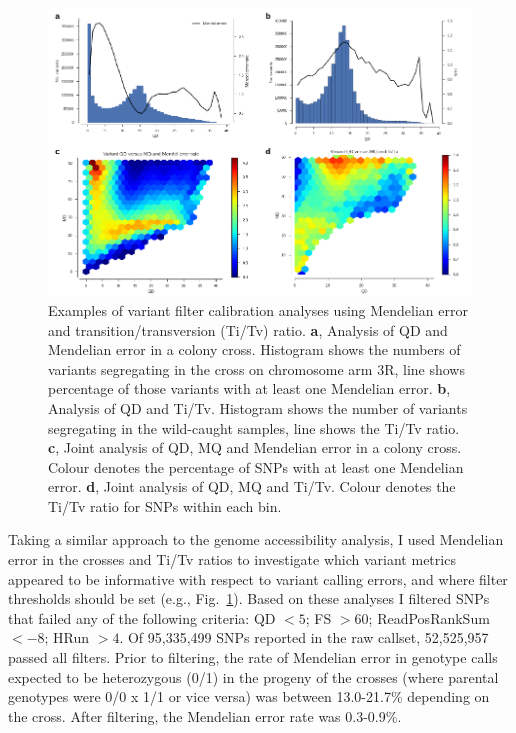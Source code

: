 \documentclass[a4paper,11pt,abstracton,hidelinks]{scrartcl}
\begin{document}
\begin{figure}[t!]
\centering
\includegraphics[width=1.1\textwidth,center]{artwork/chapter3/variant_filtering.pdf}
\caption{Examples of variant filter calibration analyses using Mendelian error and transition/transversion (Ti/Tv) ratio.
%
\textbf{a}, Analysis of QD and Mendelian error in a colony cross. Histogram shows the numbers of variants segregating in the cross on chromosome arm 3R, line shows percentage of those variants with at least one Mendelian error.
%
\textbf{b}, Analysis of QD and Ti/Tv. Histogram shows the number of variants segregating in the wild-caught samples, line shows the Ti/Tv ratio.
%
\textbf{c}, Joint analysis of QD, MQ and Mendelian error in a colony cross. Colour denotes the percentage of SNPs with at least one Mendelian error.
%
\textbf{d}, Joint analysis of QD, MQ and Ti/Tv. Colour denotes the Ti/Tv ratio for SNPs within each bin.
}
%
\label{fig:variant_filters}
\end{figure}


Taking a similar approach to the genome accessibility analysis, I used Mendelian error in the crosses and Ti/Tv ratios to investigate which variant metrics appeared to be informative with respect to variant calling errors, and where filter thresholds should be set (e.g., Fig.~\ref{fig:variant_filters}).
%
Based on these analyses I filtered SNPs that failed any of the following criteria: QD $< 5$; FS $> 60$; ReadPosRankSum $< -8$; HRun $> 4$.
%
Of 95,335,499 SNPs reported in the raw callset, 52,525,957 passed all filters.
%
Prior to filtering, the rate of Mendelian error in genotype calls expected to be heterozygous (0/1) in the progeny of the crosses (where parental genotypes were 0/0 x 1/1 or vice versa) was between 13.0-21.7\% depending on the cross.
%
After filtering, the Mendelian error rate was 0.3-0.9\%.
\end{document}

